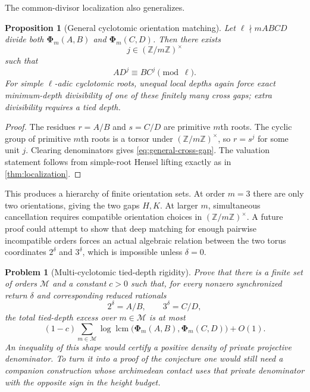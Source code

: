 \documentclass[11pt]{article}
\newtheorem{proposition}[theorem]{Proposition}
\newtheorem{problem}[theorem]{Problem}
\theoremstyle{definition}
\theoremstyle{remark}
\newcommand{\Z}{\mathbb{Z}}
\newcommand{\lcm}{\operatorname{lcm}}
\newcommand{\PhiHom}{\boldsymbol{\Phi}}
\begin{document}
The common-divisor localization also generalizes.

\begin{proposition}[General cyclotomic orientation matching]\label{prop:general-orientation}
Let $\ell\nmid mABCD$ divide both $\PhiHom_m(A,B)$ and $\PhiHom_m(C,D)$.  Then there exists
\[
 j\in(\Z/m\Z)^\times
\]
such that
\begin{equation}\label{eq:general-cross-gap}
 A D^j\equiv B C^j\pmod\ell.
\end{equation}
For simple $\ell$-adic cyclotomic roots, unequal local depths again force exact minimum-depth divisibility of one of these finitely many cross gaps; extra divisibility requires a tied depth.
\end{proposition}

\begin{proof}
The residues $r=A/B$ and $s=C/D$ are primitive $m$th roots.  The cyclic group of primitive $m$th roots is a torsor under $(\Z/m\Z)^\times$, so $r=s^j$ for some unit $j$.  Clearing denominators gives \eqref{eq:general-cross-gap}.  The valuation statement follows from simple-root Hensel lifting exactly as in \cref{thm:localization}.
\end{proof}

This produces a hierarchy of finite orientation sets.  At order $m=3$ there are only two orientations, giving the two gaps $H,K$.  At larger $m$, simultaneous cancellation requires compatible orientation choices in $(\Z/m\Z)^\times$.  A future proof could attempt to show that deep matching for enough pairwise incompatible orders forces an actual algebraic relation between the two torus coordinates $2^\delta$ and $3^\delta$, which is impossible unless $\delta=0$.

\begin{problem}[Multi-cyclotomic tied-depth rigidity]\label{prob:multi-cyclo}
Prove that there is a finite set of orders $\mathcal M$ and a constant $c>0$ such that, for every nonzero synchronized return $\delta$ and corresponding reduced rationals
\[
 2^\delta=A/B,
 \qquad
 3^\delta=C/D,
\]
the total tied-depth excess over $m\in\mathcal M$ is at most
\[
 (1-c)\sum_{m\in\mathcal M}
 \log\lcm\bigl(\PhiHom_m(A,B),\PhiHom_m(C,D)\bigr)+O(1).
\]
An inequality of this shape would certify a positive density of private projective denominator.  To turn it into a proof of the conjecture one would still need a companion construction whose archimedean contact uses that private denominator with the opposite sign in the height budget.
\end{problem}
\end{document}
